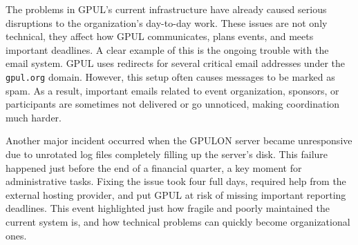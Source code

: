 The problems in GPUL's current infrastructure have already caused serious disruptions to the organization's day-to-day work. These issues are not only technical, they affect how GPUL communicates, plans events, and meets important deadlines. A clear example of this is the ongoing trouble with the email system. GPUL uses redirects for several critical email addresses under the \texttt{gpul.org} domain. However, this setup often causes messages to be marked as spam. As a result, important emails related to event organization, sponsors, or participants are sometimes not delivered or go unnoticed, making coordination much harder.

Another major incident occurred when the GPULON server became unresponsive due to unrotated log files completely filling up the server's disk. This failure happened just before the end of a financial quarter, a key moment for administrative tasks. Fixing the issue took four full days, required help from the external hosting provider, and put GPUL at risk of missing important reporting deadlines. This event highlighted just how fragile and poorly maintained the current system is, and how technical problems can quickly become organizational ones.